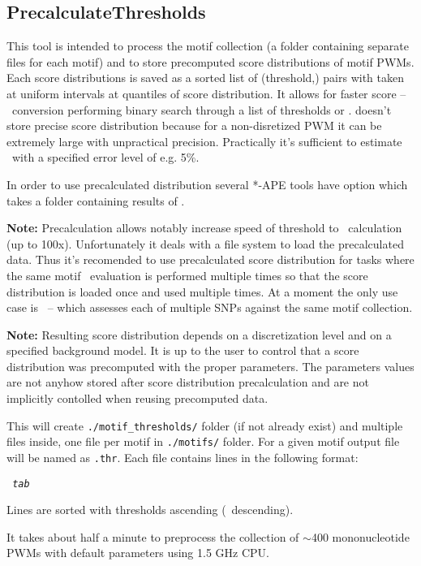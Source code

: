 \subsection{PrecalculateThresholds}
This tool is intended to process the motif collection (a folder containing separate
files for each motif) and to store precomputed score distributions of motif PWMs. Each score distributions is saved as a sorted list of \mbox{(threshold,\pvalue)} pairs with \pvalue taken at uniform intervals at quantiles of score distribution. It allows for faster score -- \pvalues\ conversion performing binary search through a list of thresholds or \pvalues.  doesn't store precise score distribution because for a non-disretized PWM it can be extremely large with unpractical precision. Practically it's sufficient to estimate \pvalue\ with a specified error level of e.g. 5\%.

In order to use precalculated distribution several *-APE tools have  option which takes a folder containing results of .

\textbf{Note:} Precalculation allows notably increase speed of threshold to \pvalue\ calculation (up to 100x). Unfortunately it deals with a file system to load the precalculated data. Thus it's recomended to use precalculated score distribution for tasks where the same motif \pvalue\ evaluation is performed multiple times so that the score distribution is loaded once and used multiple times. At a moment the only use case is ~--  which assesses each of multiple SNPs against the same motif collection.

\textbf{Note:} Resulting score distribution depends on a discretization level and on a specified background model. It is up to the user to control that a score distribution was precomputed with the proper parameters. The parameters values are not anyhow stored after score distribution precalculation and are not implicitly contolled when reusing precomputed data.

\usageheader
{}

\example{}

This will create \texttt{./motif\_thresholds/} folder (if not already exist) and multiple files inside, one file per motif in \texttt{./motifs/} folder. For a given motif output file will be named as \texttt{.thr}.
Each file contains lines in the following format:

\texttt{ \textit{tab} }

Lines are sorted with thresholds ascending (\pvalue\ descending).

It takes about half a minute to preprocess the collection of $\sim$400 mononucleotide PWMs with default
parameters using 1.5 GHz CPU.
